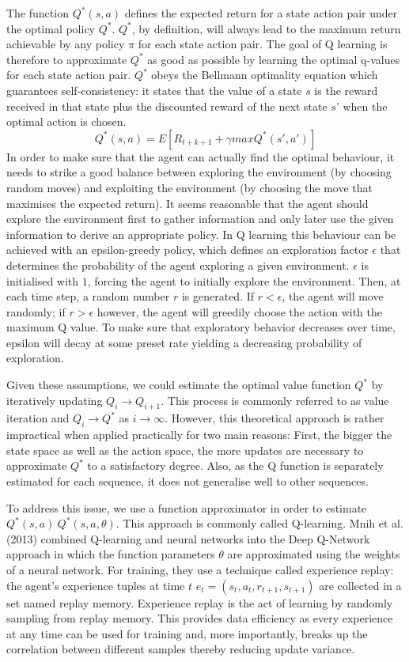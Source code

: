 \documentclass[12pt,a4paper]{article}
\begin{document}
{The function $Q^*(s,a)$ defines the expected return for a state action pair under the optimal policy $Q^*$. $Q^*$, by definition, will always lead to the maximum return achievable by any policy $\pi$ for each state action pair. The goal of Q learning is therefore to approximate $Q^*$ as good as possible by learning the optimal q-values for each state action pair. $Q^*$ obeys the Bellmann optimality equation which guarantees self-consistency: it states that the value of a state $s$ is the reward received in that state plus the discounted reward of the next state $s’$ when the optimal action is chosen.
\[ 
 Q^*(s,a) = E\left[  R_{t+k+1} +  \gamma max Q^*(s',a') \right]
\]
In order to make sure that the agent can actually find the optimal behaviour, it needs to strike a good balance between exploring the environment (by choosing random moves) and exploiting the environment (by choosing the move that maximises the expected return). It seems reasonable that the agent should explore the environment first to gather information and only later use the given information to derive an appropriate policy. In Q learning this behaviour can be achieved with an epsilon-greedy policy, which defines an exploration factor $\epsilon$ that determines the probability of the agent exploring a given environment. $\epsilon$ is initialised with $1$, forcing the agent to initially explore the environment. Then, at each time step, a random number $r$ is generated. If $r < \epsilon$, the agent will move randomly; if $r > \epsilon$ however, the agent will greedily choose the action with the maximum Q value. To make sure that exploratory behavior decreases over time, epsilon will decay at some preset rate yielding a decreasing probability of exploration.

Given these assumptions, we could estimate the optimal value function $Q^*$ by iteratively updating $Q_i \rightarrow Q_{i+1}$. This process is commonly referred to as value iteration and $Q_i \rightarrow Q^*$ as $i \rightarrow \infty$. However, this theoretical approach is rather impractical when applied practically for two main reasons: First, the bigger the state space as well as the action space, the more updates are necessary to approximate $Q^*$ to a satisfactory degree. Also, as the Q function is separately estimated for each sequence, it does not generalise well to other sequences. 

To address this issue, we use a function approximator in order to estimate $Q^*(s,a) ~ Q^*(s,a, \theta)$. This approach is commonly called Q-learning. Mnih et al. (2013) combined Q-learning and neural networks into the Deep Q-Network approach in which the function parameters $\theta$ are approximated using the weights of a neural network. For training, they use a technique called experience replay: the agent’s experience tuples at time $t$ $e_t = (s_t, a_t, r_{t+1}, s_{t+1})$ are collected in a set named replay memory. Experience replay is the act of learning by randomly sampling from replay memory. This provides data efficiency as every experience at any time can be used for training and, more importantly, breaks up the correlation between different samples thereby reducing update variance. 

}
\end{document}

